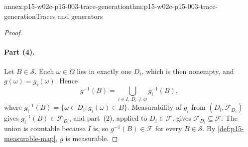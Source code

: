 \begin{annexitem}{annex:p15-w02c-p15-003-trace-generation}{thm:p15-w02c-p15-003-trace-generation}{Traces and generators}
\begin{proof}
\paragraph{Part (4).}
Let \(B\in\mathcal S\). Each \(\omega\in\Omega\) lies in exactly one
\(D_i\), which is then nonempty, and \(g(\omega)=g_i(\omega)\). Hence
\[
 g^{-1}(B)=\bigcup_{i\in I,\ D_i\neq\varnothing}g_i^{-1}(B),
\]
where \(g_i^{-1}(B)=\{\omega\in D_i:g_i(\omega)\in B\}\). Measurability
of \(g_i\) from \((D_i,\mathcal F_{D_i})\) gives
\(g_i^{-1}(B)\in\mathcal F_{D_i}\), and part~(2), applied to
\(D_i\in\mathcal F\), gives \(\mathcal F_{D_i}\subseteq\mathcal F\).
The union is countable because \(I\) is, so \(g^{-1}(B)\in\mathcal F\)
for every \(B\in\mathcal S\). By \cref{def:p15-measurable-map}, \(g\) is
measurable.
\end{proof}
\end{annexitem}

